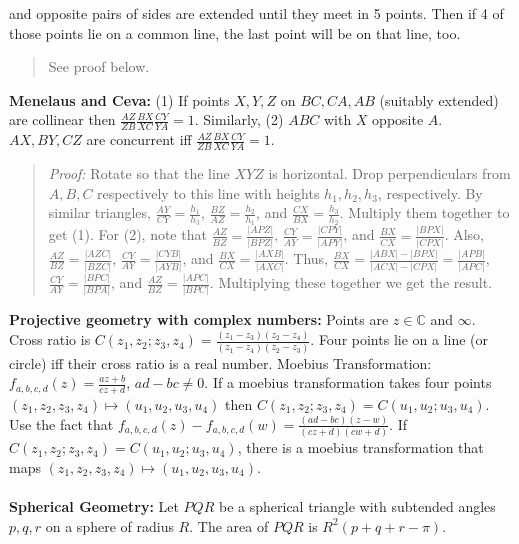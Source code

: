 and opposite pairs of sides are extended until they meet in 5 points. Then if 
4 of those points lie on a common line, the last point will be on that line, too. 
\begin{quote}
See proof below.
\end{quote}
{\bf Menelaus and Ceva:} (1) If points $X, Y, Z$ on $BC, CA, AB$ (suitably extended) are collinear
then $\frac {AZ} {ZB} \frac {BX} {XC} \frac {CY} {YA}  = 1$.  Similarly, (2)
$ABC$ with $X$ opposite $A$. $AX, BY, CZ$ are concurrent iff
$\frac {AZ} {ZB} \frac {BX} {XC} \frac {CY} {YA}  = 1 $.
\begin{quote}
\emph{Proof:} 
Rotate so that the line $XYZ$ is horizontal.  Drop perpendiculars from $A, B, C$ respectively to this
line with heights $h_1, h_2, h_3$, respectively.  By similar triangles,
${\frac {AY}{CY}} = {\frac {h_1} {h_3}}$,
${\frac {BZ}{AZ}} = {\frac {h_2} {h_1}}$, and
${\frac {CX}{BX}} = {\frac {h_3} {h_2}}$.  Multiply them together to get (1).
For (2), note that
${\frac {AZ}{BZ}}= {\frac {|APZ|} {|BPZ|}}$,
${\frac {CY}{AY}}= {\frac {|CPY|} {|APY|}}$, and
${\frac {BX}{CX}}= {\frac {|BPX|} {|CPX|}}$.
Also,
${\frac {AZ}{BZ}}= {\frac {|AZC|} {|BZC|}}$,
${\frac {CY}{AY}}= {\frac {|CYB|} {|AYB|}}$, and
${\frac {BX}{CX}}= {\frac {|AXB|} {|AXC|}}$.
Thus,
${\frac {BX} {CX}}= {\frac {|ABX|-|BPX|}{|ACX|-|CPX|}}= {\frac {|APB|} {|APC|}}$,
${\frac {CY} {AY}}= {\frac {|BPC|} {|BPA|}}$, and
${\frac {AZ} {BZ}}= {\frac {|APC|} {|BPC|}}$.
Multiplying these together we get the result.
\end{quote}
{\bf Projective geometry with complex numbers:}  Points are $z \in {\mathbb C}$ and $\infty$.  Cross ratio is 
$C(z_1, z_2; z_3, z_4) = {\frac {(z_1 - z_3)(z_2 - z_4)}{(z_1-z_4)(z_2-z_3)}}$.  Four points lie on a line (or circle) iff their
cross ratio is a real number.  Moebius Transformation: $f_{a,b,c,d}(z) = {\frac {az+b} {cz+d}}$, $ad-bc \ne 0$.
If a moebius transformation takes four points $(z_1, z_2, z_3, z_4) \mapsto (u_1, u_2, u_3, u_4)$ then
$C(z_1, z_2; z_3, z_4) = C(u_1, u_2; u_3, u_4)$.
Use the fact that $f_{a,b,c,d}(z) - f_{a,b,c,d}(w) = {\frac {(ad-bc)(z-w)}{(cz+d)(cw+d)}}$.
If $C(z_1, z_2; z_3, z_4) = C(u_1, u_2; u_3, u_4)$, there is a moebius transformation that maps $(z_1, z_2, z_3, z_4) \mapsto (u_1, u_2, u_3, u_4)$.
\\
\\
{\bf Spherical Geometry:}  Let $PQR$ be a spherical triangle with subtended angles
$p, q, r$ on a sphere of radius $R$.  The area of $PQR$ is $R^2(p+q+r-\pi)$.
